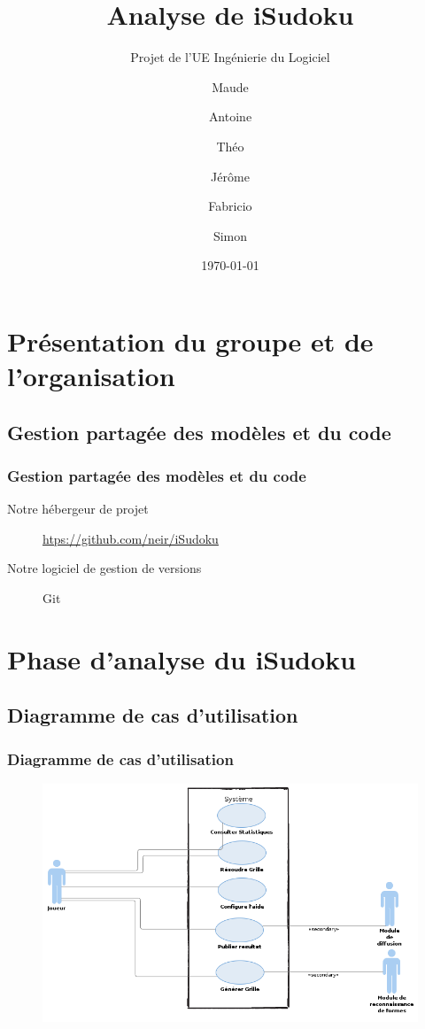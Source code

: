 \documentclass{beamer}
\title[Analyse de iSudoku]{Analyse de iSudoku}
\subtitle[\ldots]{Projet de l'UE Ingénierie du Logiciel}
\author{
  Maude \bsc{Bellamy}
  \and
  Antoine \bsc{Houssais}
  \and
  Théo \bsc{Lebourg}
  \and
  Jérôme \bsc{Rahault}
  \and
  Fabricio \bsc{Santolin Da Silva}
  \and
  Simon \bsc{Tchernia}
}
\institute{Université Pierre et Marie Curie}
\date{\today}
\begin{document}
\maketitle

\section{Présentation du groupe et de l’organisation}
\subsection{Gestion partagée des modèles et du code}
\begin{frame}
  \frametitle{Gestion partagée des modèles et du code}
  \begin{description}
    \item [Notre hébergeur de projet] \url{htps://github.com/neir/iSudoku}
      \pause
    \item [Notre logiciel de gestion de versions] Git
\end{description}
\end{frame}
\section{Phase d’analyse du iSudoku}
\subsection{Diagramme de cas d’utilisation}
\begin{frame}
\frametitle{Diagramme de cas d'utilisation}
\begin{figure}[h]
  \includegraphics[scale=0.4]{diagrammeCasDUtilisation.png}
\end{figure}
\end{frame}
\end{document}
